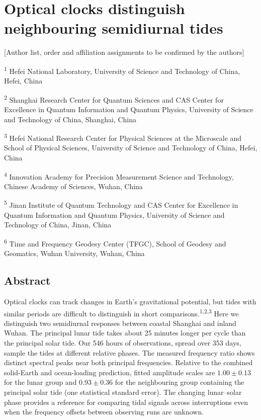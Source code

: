 \documentclass[
  10pt,
  a4paper,
]{article}
\author{}
\date{}
\begin{document}
\hypertarget{optical-clocks-distinguish-neighbouring-semidiurnal-tides}{%
\section{Optical clocks distinguish neighbouring semidiurnal
tides}\label{optical-clocks-distinguish-neighbouring-semidiurnal-tides}}

{[}Author list, order and affiliation assignments to be confirmed by the
authors{]}

\textsuperscript{1} Hefei National Laboratory, University of Science and
Technology of China, Hefei, China

\textsuperscript{2} Shanghai Research Center for Quantum Sciences and
CAS Center for Excellence in Quantum Information and Quantum Physics,
University of Science and Technology of China, Shanghai, China

\textsuperscript{3} Hefei National Research Center for Physical Sciences
at the Microscale and School of Physical Sciences, University of Science
and Technology of China, Hefei, China

\textsuperscript{4} Innovation Academy for Precision Measurement Science
and Technology, Chinese Academy of Sciences, Wuhan, China

\textsuperscript{5} Jinan Institute of Quantum Technology and CAS Center
for Excellence in Quantum Information and Quantum Physics, University of
Science and Technology of China, Jinan, China

\textsuperscript{6} Time and Frequency Geodesy Center (TFGC), School of
Geodesy and Geomatics, Wuhan University, Wuhan, China

\hypertarget{abstract}{%
\subsection{Abstract}\label{abstract}}

Optical clocks can track changes in Earth's gravitational potential, but
tides with similar periods are difficult to distinguish in short
comparisons.\textsuperscript{1,2,3} Here we distinguish two semidiurnal
responses between coastal Shanghai and inland Wuhan. The principal lunar
tide takes about 25 minutes longer per cycle than the principal solar
tide. Our 546 hours of observations, spread over 353 days, sample the
tides at different relative phases. The measured frequency ratio shows
distinct spectral peaks near both principal frequencies. Relative to the
combined solid-Earth and ocean-loading prediction, fitted amplitude
scales are \(1.00\pm0.13\) for the lunar group and \(0.93\pm0.36\) for
the neighbouring group containing the principal solar tide (one
statistical standard error). The changing lunar--solar phase provides a
reference for comparing tidal signals across interruptions even when the
frequency offsets between observing runs are unknown.
\end{document}
